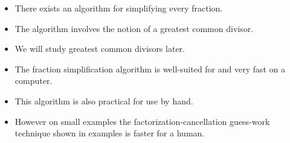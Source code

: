 \begin{frame}
\begin{itemize}
\item There exists an algorithm for simplifying every fraction. 
\item<2-> The algorithm involves the notion of a greatest common divisor.
\item<3-> We will study greatest common divisors later.
\item<4-> The fraction simplification algorithm is well-suited for and very fast on a computer. 
\item<5-> This algorithm is also practical for use by hand.
\item<6-> However on small examples the factorization-cancellation guess-work technique shown in examples is faster for a human.
\end{itemize}
\end{frame}